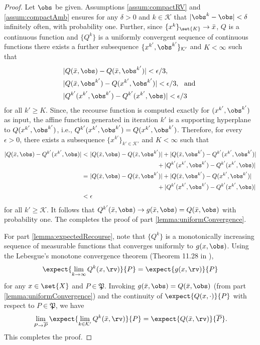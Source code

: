 \documentclass[11pt]{article}
\newcommand{\probset}{\mathfrak{P}}
\begin{document}
\begin{proof}
Let $\obs$ be given. Assumptions \ref{assum:compactRV} and \ref{assum:compactAmb} ensures for any $\delta > 0$ and $k \in \mathcal{K}$ that $|\obs^k - \obs| < \delta$ infinitely often, with probability one. Further, since $\{x^k\}_{\set{K}} \rightarrow \bar{x}$, $Q$ is a continuous function and $\{Q^k\}$ is a uniformly convergent sequence of continuous functions there exists a further subsequence $\{x^{k'},\obs^{k'}\}_{\mathcal{K}'}$ and $K < \infty$ such that  
\begin{align*}
    &|Q(\bar{x},\obs) - Q(\bar{x},\obs^{k'})| <\epsilon/3, \\    
    &|Q(\bar{x},\obs^{k'}) - Q(x^{k'},\obs^{k'})| <\epsilon/3, \ \text{ and } \\    
    &|Q^{k'}(x^{k'},\obs^{k'}) - Q^{k'}(x^{k'},\obs)| <\epsilon/3
\end{align*}
for all $k' \geq K$. Since, the recourse function is computed exactly for $(x^{k'}, \obs^{k'})$ as input, the affine function generated in iteration $k'$ is a supporting hyperplane to $Q(x^{k'}, \obs^{k'})$, i.e., $Q^{k'}(x^{k'}, \obs^{k'}) = Q(x^{k'}, \obs^{k'})$. Therefore, for every $\epsilon >0$, there exists a subsequence $\{x^{k'}\}_{k' \in \mathcal{K}'}$ and $K < \infty$ such that
\begin{align*}
     |Q(\bar{x},\obs) - Q^{k'}(x^{k'},\obs)| < & \ | Q(\bar{x}, \obs) - Q(\bar{x},\obs^{k'})| + |Q(\bar{x},\obs^{k'}) - Q^{k'}(x^{k'},\obs^{k'})| \\& \hspace*{4cm} + |Q^{k'}(x^{k'},\obs^{k'}) - Q^{k'}(x^{k'},\obs)| \\
     = & \ | Q(\bar{x}, \obs) - Q(\bar{x},\obs^{k'})| + |Q(\bar{x},\obs^{k'}) - Q(x^{k'},\obs^{k'})| \\ & \hspace*{4cm} + |Q^{k'}(x^{k'},\obs^{k'}) - Q^{k'}(x^{k'},\obs)| \\
     < &~ \epsilon
\end{align*}
for all $k' \geq \mathcal{K}$. It follows that $Q^{k'}(\bar{x},\obs) \rightarrow g(\bar{x},\obs) = Q(\bar{x},\obs)$ with probability one. The completes the proof of part \ref{lemma:uniformConvergence}.

For part \ref{lemma:expectedRecourse}, note that $\{Q^k\}$ is a monotonically increasing sequence of measurable functions that converges uniformly to $g(x,\obs)$. Using the Lebesgue's monotone convergence theorem (Theorem 11.28 in \cite{Rudin1976}), \begin{align*}
    \expect{\lim_{k \rightarrow \infty} Q^k(x,\rv)}{P} = \expect{g(x,\rv)}{P}
\end{align*}
for any $x \in \set{X}$ and $P \in \mathfrak{P}$. Invoking $g(\bar{x}, \obs) = Q(\bar{x}, \obs)$ (from part \ref{lemma:uniformConvergence}) and the continuity of $\expect{Q(x,\cdot)}{P}$ with respect to $P \in \probset$, we have
\begin{align*}
    \lim_{P \rightarrow \overline{P}} \expect{\lim_{k \in \mathcal{K}'} Q^k(\bar{x},\rv)}{P} = \expect{Q(\bar{x},\rv)}{\overline{P}}.
\end{align*}
This completes the proof.
\end{proof}
\end{document}
